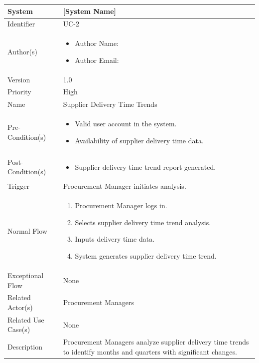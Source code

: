 \begin{center}
	\begin{tabularx}{\textwidth}{|l|X|}
		\hline
		System & [System Name] \\
		\hline
		Identifier & UC-2 \\
		\hline
		Author(s) & \begin{itemize}[left=0pt]
			\item Author Name:
			\item Author Email:
		\end{itemize} \\
		\hline
		Version & 1.0 \\
		\hline
		Priority & High \\
		\hline
		Name & Supplier Delivery Time Trends \\
		\hline
		Pre-Condition(s) &  \begin{itemize}[left=0pt]
			\item Valid user account in the system.
			\item Availability of supplier delivery time data.
		\end{itemize} \\
		\hline
		Post-Condition(s) & \begin{itemize}[left=0pt]
			\item Supplier delivery time trend report generated.
		\end{itemize} \\
		\hline
		Trigger & Procurement Manager initiates analysis. \\
		\hline
		Normal Flow & \begin{enumerate}[left=0pt]
			\item Procurement Manager logs in.
			\item Selects supplier delivery time trend analysis.
			\item Inputs delivery time data.
			\item System generates supplier delivery time trend.
		\end{enumerate} \\
		\hline
		Exceptional Flow & None \\
		\hline
		Related Actor(s) & Procurement Managers \\
		\hline
		Related Use Case(s) & None \\
		\hline
		Description & Procurement Managers analyze supplier delivery time trends to identify months and quarters with significant changes. \\
		\hline
	\end{tabularx}
\end{center}

